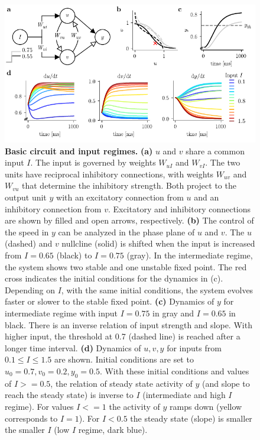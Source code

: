 \documentclass[10pt]{article}
\begin{document}
\begin{figure}[ht]
	\centering
	\includegraphics{figures/defCircuit_nullcl.pdf}
	\caption{\textbf{Basic circuit and input regimes.} 
	\textbf{(a)} $u$ and $v$ share a common input $I$. The input is governed by weights $W_{uI}$ and $W_{vI}$. The two units have reciprocal inhibitory connections, with weights $W_{uv}$ and $W_{vu}$ that determine the inhibitory strength. Both project to the output unit $y$ with an excitatory connection from $u$ and an inhibitory connection from $v$. Excitatory and inhibitory connections are shown by filled and open arrows, respectively. 
	\textbf{(b)} The control of the speed in $y$ can be analyzed in the phase plane of $u$ and $v$. The $u$ (dashed) and $v$ nullcline (solid) is shifted when the input is increased from $I=0.65$ (black) to $I=0.75$ (gray). In the intermediate regime, the system shows two stable and one unstable fixed point. The red cross indicates the initial conditions for the dynamics in (c). Depending on $I$, with the same initial conditions, the system evolves faster or slower to the stable fixed point. 
	\textbf{(c)} Dynamics of $y$ for intermediate regime with input $I=0.75$ in gray and $I=0.65$ in black. There is an inverse relation of input strength and slope. With higher input, the threshold at 0.7 (dashed line) is reached after a longer time interval. 
	\textbf{(d)} Dynamics of $u, v, y$ for inputs from $0.1\leq I \leq 1.5$ are shown. Initial conditions are set to $u_0=0.7, v_0=0.2, y_0=0.5$. With these initial conditions and values of $I>=0.5$, the relation of steady state activity of $y$ (and slope to reach the steady state) is inverse to $I$ (intermediate and high $I$ regime). For values $I<=1$ the activity of $y$ ramps down (yellow corresponds to $I=1$). For $I<0.5$ the steady state (slope) is smaller the smaller $I$ (low $I$ regime, dark blue).}
\label{fig:circuit}
\end{figure}
\end{document}
